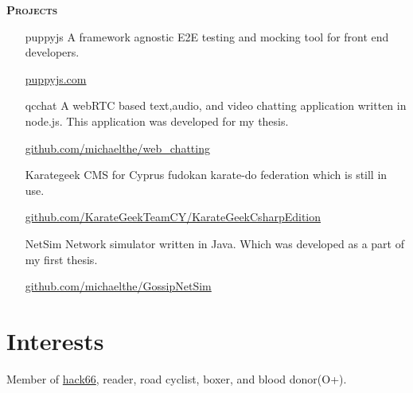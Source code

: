 \documentclass[margin, 10pt]{res} %
\begin{document}
\begin{resume}
\begin{itemize}
        \end{itemize}

        \textsc{ \textbf{Projects}}

        \begin{itemize}

            \item[puppyjs] A framework agnostic E2E testing and mocking tool for front end developers.

            \href{http://www.puppyjs.com}{puppyjs.com} \\

            \item[qcchat] A webRTC based text,audio, and video chatting application written in node.js.
            This application was developed for my thesis.

            \href{https://github.com/michaelthe/web_chatting}{github.com/michaelthe/web\_chatting} \\

            \item[Karategeek] CMS for Cyprus fudokan karate-do federation which is still in use.

            \href{https://github.com/KarateGeekTeamCY/KarateGeekCsharpEdition/tree/baseV4.5.1}{github.com/KarateGeekTeamCY/KarateGeekCsharpEdition} \\

            \item[NetSim] Network simulator written in Java.
            Which was developed as a part of my first thesis.

            \href{https://github.com/michaelthe/GossipNetSim}{github.com/michaelthe/GossipNetSim}

        \end{itemize}

        \section{Interests}

        Member of \href{http://hack66.info/}{hack66}, reader, road cyclist, boxer, and blood donor(O+).

    \end{resume}
\end{document}
